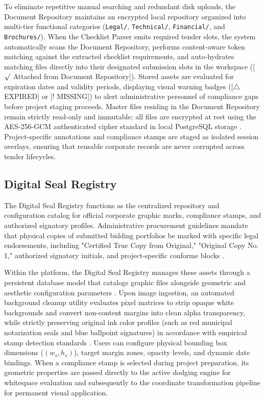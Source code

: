 To eliminate repetitive manual searching and redundant disk uploads, the Document Repository maintains an encrypted local repository organized into multi-tier functional categories (\texttt{Legal/}, \texttt{Technical/}, \texttt{Financial/}, and \texttt{Brochures/}).
When the Checklist Parser emits required tender slots, the system automatically scans the Document Repository, performs content-aware token matching against the extracted checklist requirements, and auto-hydrates matching files directly into their designated submission slots in the workspace ([\ensuremath{\surd} Attached from Document Repository]).
Stored assets are evaluated for expiration dates and validity periods, displaying visual warning badges ([\ensuremath{\triangle} EXPIRED] or [! MISSING]) to alert administrative personnel of compliance gaps before project staging proceeds.
Master files residing in the Document Repository remain strictly read-only and immutable; all files are encrypted at rest using the AES-256-GCM authenticated cipher standard \cite{ref56} in local PostgreSQL storage \cite{ref55}.
Project-specific annotations and compliance stamps are staged as isolated session overlays, ensuring that reusable corporate records are never corrupted across tender lifecycles.

\subsection{Digital Seal Registry}
The Digital Seal Registry functions as the centralized repository and configuration catalog for official corporate graphic marks, compliance stamps, and authorized signatory profiles.
Administrative procurement guidelines mandate that physical copies of submitted bidding portfolios be marked with specific legal endorsements, including "Certified True Copy from Original," "Original Copy No. 1," authorized signatory initials, and project-specific conforme blocks \cite{ref46}.

Within the platform, the Digital Seal Registry manages these assets through a persistent database model that catalogs graphic files alongside geometric and aesthetic configuration parameters \cite{ref45}.
Upon image ingestion, an automated background cleanup utility evaluates pixel matrices to strip opaque white backgrounds and convert non-content margins into clean alpha transparency, while strictly preserving original ink color profiles (such as red municipal notarization seals and blue ballpoint signatures) in accordance with empirical stamp detection standards \cite{ref49}.
Users can configure physical bounding box dimensions ($(w_s, h_s)$), target margin zones, opacity levels, and dynamic date bindings.
When a compliance stamp is selected during project preparation, its geometric properties are passed directly to the active dodging engine for whitespace evaluation and subsequently to the coordinate transformation pipeline for permanent visual application.

